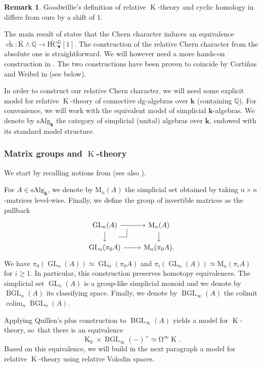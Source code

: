\documentclass[11pt]{article}
\let\autoref\Cref
\let\widebar\bar
\newcommand{\sbullet}{{\scriptscriptstyle\bullet}}
\theoremstyle{definition}
\newtheorem{rmq}[thm]{Remark}
\newcommand{\Q}{\mathbb{Q}}
\DeclareMathOperator{\colim}{colim}
\DeclareMathOperator{\BGL}{BGL}
\DeclareMathOperator{\K}{K}
\newcommand{\cart}{\arrow[dr, phantom,
"\text{\tikz[baseline=0em,xscale=0.04em,yscale=0.04em]
\draw[-] (-1,0) -- (0,0) -- (0,1) ;}\mkern1mu\relax",
very near start]}
\newcommand{\bch}{\widebar{\operatorname{ch}}}
\newcommand{\GL}{\operatorname{GL}}
\newcommand{\bK}{\widebar{\mathrm{K}}}
\newcommand{\bHC}{\widebar{\mathrm{HC}}{}}
\newcommand{\infloop}{\operatorname{\Omega^\infty}}
\renewcommand{\k}{{\boldsymbol{k}}}
\newcommand{\sAlg}{\mathrm{sAlg}}
\begin{document}
\begin{rmq}
Goodwillie's definition of relative $\K$-theory and cyclic homology in \cite{goodwillie:tangentk} differs from ours by a shift of $1$.
\end{rmq}

The main result of \cite{goodwillie:tangentk} states that the Chern character induces an equivalence $\bch \colon \bK \wedge \Q \to \bHC_\sbullet^\Q[1]$.
The construction of the relative Chern character from the absolute one is straightforward. We will however need a more hands-on construction in \autoref{sec:tracemap}. The two constructions have been proven to coincide by Cortiñas and Weibel in \cite{cortinasweibel:relative} (see \autoref{rmq:relChern} below).

In order to construct our relative Chern character, we will need some explicit model for relative $\K$-theory of connective dg-algebras over $\k$ (containing $\Q$).
For convenience, we will work with the equivalent model of simplicial $\k$-algebras. We denote by $\sAlg_\k$ the category of simplicial (unital) algebras over $\k$, endowed with its standard model structure.

\subsubsection{Matrix groups and $\K$-theory}

We start by recalling notions from \cite{waldhausen:ktheory} (see also \cite{goodwillie:tangentk}).

For $A \in \sAlg_\k$, we denote by $\mathrm{M}_n(A)$ the simplicial set obtained by taking $n \times n$-matrices level-wise. Finally, we define the group of invertible matrices as the pullback
\[
\begin{tikzcd}[row sep=1.4em]
\GL_n(A) \arrow[r] \cart \arrow[d] & \mathrm{M}_n(A) \arrow[d] \\
\GL_n(\pi_0A) \arrow[r] & \mathrm{M}_n(\pi_0A).
\end{tikzcd}
\]
We have $\pi_0(\GL_n(A)) \simeq \GL_n(\pi_0A)$ and $\pi_i(\GL_n(A)) \simeq \mathrm{M}_n(\pi_i A)$ for $i \geq 1$. In particular, this construction preserves homotopy equivalences. The simplicial set $\GL_n(A)$ is a group-like simplicial monoid and we denote by $\BGL_n(A)$ its classifying space.
Finally, we denote by $\BGL_\infty(A)$ the colimit $\colim_n \BGL_n(A)$.

Applying Quillen's plus construction to $\BGL_\infty(A)$ yields a model for $\K$-theory, so~that there is an equivalence\vspace*{-3pt}\enlargethispage{.8\baselineskip}%
\[
\K_0 \times \BGL_\infty(-)^+ \simeq \infloop \K.
\]
Based on this equivalence, we will build in the next paragraph a model for relative $\K$-theory using relative Volodin spaces.
\end{document}
